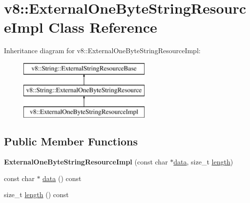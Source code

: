 \hypertarget{classv8_1_1_external_one_byte_string_resource_impl}{}\section{v8\+:\+:External\+One\+Byte\+String\+Resource\+Impl Class Reference}
\label{classv8_1_1_external_one_byte_string_resource_impl}
Inheritance diagram for v8\+:\+:External\+One\+Byte\+String\+Resource\+Impl\+:\begin{figure}[H]
\begin{center}
\leavevmode
\includegraphics[height=3.000000cm]{classv8_1_1_external_one_byte_string_resource_impl}
\end{center}
\end{figure}
\subsection*{Public Member Functions}
\begin{DoxyCompactItemize}
\item 
{\bfseries External\+One\+Byte\+String\+Resource\+Impl} (const char $\ast$\hyperlink{classv8_1_1_external_one_byte_string_resource_impl_a37ada5dc21ecb982c50482c90fffe529}{data}, size\+\_\+t \hyperlink{classv8_1_1_external_one_byte_string_resource_impl_aedcf350d46f64cf1e3045658920d1dc8}{length})\hypertarget{classv8_1_1_external_one_byte_string_resource_impl_a46178fb208419f5ea99552871b3a373e}{}\label{classv8_1_1_external_one_byte_string_resource_impl_a46178fb208419f5ea99552871b3a373e}

\item 
const char $\ast$ \hyperlink{classv8_1_1_external_one_byte_string_resource_impl_a37ada5dc21ecb982c50482c90fffe529}{data} () const 
\item 
size\+\_\+t \hyperlink{classv8_1_1_external_one_byte_string_resource_impl_aedcf350d46f64cf1e3045658920d1dc8}{length} () const 
\end{DoxyCompactItemize}
